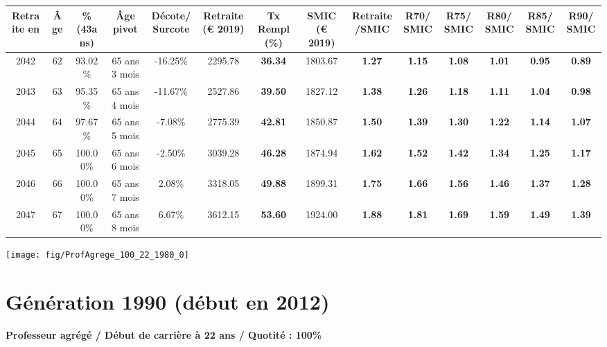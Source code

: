\begin{adjustbox}{max width=\textwidth} 
\begin{tabular}[htb]{|c|c||c|c|c||c|c||c|c||c|c|c|c|c|} 
\hline 
 Retraite en &  Âge &  \%(43ans) &  Âge pivot &  Décote/Surcote &  Retraite (\euro{} 2019) &  Tx Rempl(\%) &  SMIC (\euro{} 2019) &  Retraite/SMIC &  R70/SMIC &  R75/SMIC &  R80/SMIC &  R85/SMIC &  R90/SMIC \\ 
\hline \hline 
 2042 &  62 &  93.02\% &  65 ans 3 mois &  -16.25\% &  2295.78 &  {\bf 36.34} &  1803.67 &  {\bf 1.27} &  {\bf 1.15} &  {\bf 1.08} &  {\bf 1.01} &  {\bf {\color{red} 0.95}} &  {\bf {\color{red} 0.89}} \\ 
\hline 
 2043 &  63 &  95.35\% &  65 ans 4 mois &  -11.67\% &  2527.86 &  {\bf 39.50} &  1827.12 &  {\bf 1.38} &  {\bf 1.26} &  {\bf 1.18} &  {\bf 1.11} &  {\bf 1.04} &  {\bf {\color{red} 0.98}} \\ 
\hline 
 2044 &  64 &  97.67\% &  65 ans 5 mois &  -7.08\% &  2775.39 &  {\bf 42.81} &  1850.87 &  {\bf 1.50} &  {\bf 1.39} &  {\bf 1.30} &  {\bf 1.22} &  {\bf 1.14} &  {\bf 1.07} \\ 
\hline 
 2045 &  65 &  100.00\% &  65 ans 6 mois &  -2.50\% &  3039.28 &  {\bf 46.28} &  1874.94 &  {\bf 1.62} &  {\bf 1.52} &  {\bf 1.42} &  {\bf 1.34} &  {\bf 1.25} &  {\bf 1.17} \\ 
\hline 
 2046 &  66 &  100.00\% &  65 ans 7 mois &  2.08\% &  3318.05 &  {\bf 49.88} &  1899.31 &  {\bf 1.75} &  {\bf 1.66} &  {\bf 1.56} &  {\bf 1.46} &  {\bf 1.37} &  {\bf 1.28} \\ 
\hline 
 2047 &  67 &  100.00\% &  65 ans 8 mois &  6.67\% &  3612.15 &  {\bf 53.60} &  1924.00 &  {\bf 1.88} &  {\bf 1.81} &  {\bf 1.69} &  {\bf 1.59} &  {\bf 1.49} &  {\bf 1.39} \\ 
\hline 
\hline 
\end{tabular} 
\end{adjustbox} 
 
 \vspace{0.1cm} 

 {\hspace{-2.2cm}\texttt{[image: fig/ProfAgrege\_100\_22\_1980\_0]}} 

\newpage 
 
\section{Génération 1990 (début en 2012)\label{ProfAgrege_100_22_1990_0}} 
 
{\bf \noindent Professeur agrégé / Début de carrière à 22 ans / Quotité : 100\%}  ~ 

